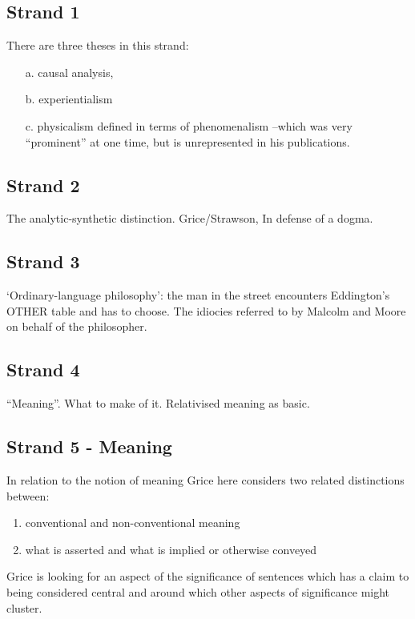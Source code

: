\documentclass[10pt,titlepage]{book}
\begin{document}
\subsection{Strand 1}

There are three theses in this strand:
\begin{itemize}
\item[a.] causal analysis,
\item[b.] experientialism
\item[c.] physicalism defined in terms of phenomenalism
--which was very ``prominent'' at one time, but is unrepresented in his
publications.
\end{itemize}

\subsection{Strand 2}

The analytic-synthetic distinction.
Grice/Strawson, In defense of a
dogma.

\subsection{Strand 3}

`Ordinary-language philosophy': the man in the street encounters
Eddington's OTHER table and has to choose. The idiocies referred to by
Malcolm and Moore on behalf of the philosopher.

\subsection{Strand 4}

``Meaning''.
What to make of it.
Relativised meaning as basic.

\subsection{Strand 5 - Meaning}

In relation to the notion of meaning Grice here considers two related distinctions between:

\begin{enumerate}
\item conventional and non-conventional meaning
\item what is asserted and what is implied or otherwise conveyed
\end{enumerate}

Grice is looking for an aspect of the significance of sentences which has a claim to being considered central and around which other aspects of significance might cluster.
\end{document}
